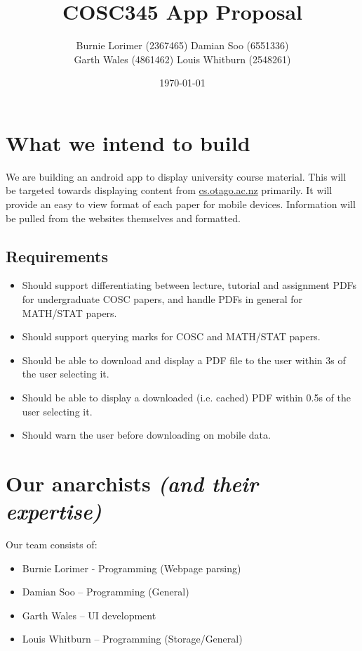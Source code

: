 \documentclass{article}
\title{COSC345 App Proposal}
\author{Burnie Lorimer (2367465) Damian Soo (6551336) \\ Garth Wales (4861462) Louis Whitburn (2548261)}
\date{\today}
\begin{document}
	\maketitle
	
	\section{What we intend to build}
	
	We are building an android app to display university course material. This will be targeted towards displaying content from \url{cs.otago.ac.nz} primarily. It will provide an easy to view format of each paper for mobile devices. Information will be pulled from the websites themselves and formatted.
	
	\subsection{Requirements}
	
	\begin{itemize}
		\item Should support differentiating between lecture, tutorial and assignment PDFs for undergraduate COSC papers, and handle PDFs in general for MATH/STAT papers.
		\item Should support querying marks for COSC and MATH/STAT papers.
		\item Should be able to download and display a PDF file to the user within 3s of the user selecting it.
		\item Should be able to display a downloaded (i.e. cached) PDF within 0.5s of the user selecting it.
		\item Should warn the user before downloading on mobile data.
	\end{itemize}
	
	\section{Our anarchists \textit{(and their expertise)}} 
	
	Our team consists of: 
	\begin{itemize}
		\item Burnie Lorimer - Programming (Webpage parsing)
		\item Damian Soo – Programming (General)
		\item Garth Wales – UI development
		\item Louis Whitburn – Programming (Storage/General)
	\end{itemize}
\end{document}

